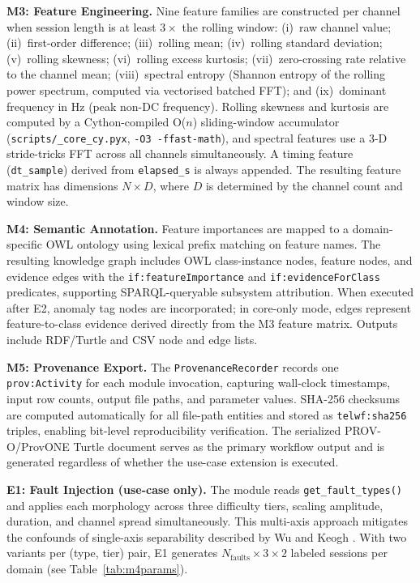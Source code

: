 \documentclass[conference]{IEEEtran}
\begin{document}
\textbf{M3: Feature Engineering.} Nine feature families are constructed per channel when session length is at least $3\times$ the rolling window: (i)~raw channel value; (ii)~first-order difference; (iii)~rolling mean; (iv)~rolling standard deviation; (v)~rolling skewness; (vi)~rolling excess kurtosis; (vii)~zero-crossing rate relative to the channel mean; (viii)~spectral entropy (Shannon entropy of the rolling power spectrum, computed via vectorised batched FFT); and (ix)~dominant frequency in Hz (peak non-DC frequency). Rolling skewness and kurtosis are computed by a Cython-compiled O($n$) sliding-window accumulator (\texttt{scripts/\_core\_cy.pyx}, \texttt{-O3 -ffast-math}), and spectral features use a 3-D stride-tricks FFT across all channels simultaneously. A timing feature (\texttt{dt\_sample}) derived from \texttt{elapsed\_s} is always appended. The resulting feature matrix has dimensions $N \times D$, where $D$ is determined by the channel count and window size.

\textbf{M4: Semantic Annotation.} Feature importances are mapped to a domain-specific OWL ontology using lexical prefix matching on feature names. The resulting knowledge graph includes OWL class-instance nodes, feature nodes, and evidence edges with the \texttt{if:featureImportance} and \texttt{if:evidenceForClass} predicates, supporting SPARQL-queryable subsystem attribution. When executed after E2, anomaly tag nodes are incorporated; in core-only mode, edges represent feature-to-class evidence derived directly from the M3 feature matrix. Outputs include RDF/Turtle and CSV node and edge lists.

\textbf{M5: Provenance Export.} The \texttt{ProvenanceRecorder} records one \texttt{prov:Activity} for each module invocation, capturing wall-clock timestamps, input row counts, output file paths, and parameter values. SHA-256 checksums are computed automatically for all file-path entities and stored as \texttt{telwf:sha256} triples, enabling bit-level reproducibility verification. The serialized PROV-O/ProvONE Turtle document serves as the primary workflow output and is generated regardless of whether the use-case extension is executed.

\textbf{E1: Fault Injection (use-case only).} The module reads \texttt{get\_fault\_types()} and applies each morphology across three difficulty tiers, scaling amplitude, duration, and channel spread simultaneously. This multi-axis approach mitigates the confounds of single-axis separability described by Wu and Keogh \cite{wu2022benchmarks}. With two variants per (type, tier) pair, E1 generates $N_{\text{faults}} \times 3 \times 2$ labeled sessions per domain (see Table~\ref{tab:m4params}).
\end{document}
